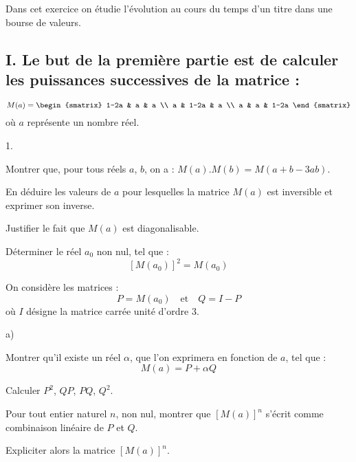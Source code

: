 \documentclass[11pt]{article}%
\begin{document}
Dans cet exercice on étudie l'évolution au cours du temps d'un titre
dans
une bourse de valeurs.

\subsection*{I. Le but de la première partie est de calculer les
puissances
successives de la matrice :}

\[
M(a) = 
\begin{smatrix}
1-2a & a & a \\
a & 1-2a & a \\
a & a & 1-2a
\end{smatrix}
\]
où $a$ représente un nombre réel.

\begin{noliste}{1.}
 \setlength{\itemsep}{4mm}
\item Montrer que, pour tous réels $a$, $b$, on a : $M(a).M(b) = M(a +
b-3ab)$.

\item En déduire les valeurs de $a$ pour lesquelles la matrice $M(a)$
est
inversible et exprimer son inverse.

\item Justifier le fait que $M(a)$ est diagonalisable.

\item Déterminer le réel $a_{0}$ non nul, tel que : 
\[
\left[ M(a_{0})\right] ^{2} = M(a_{0})
\]

\item On considère les matrices : 
\[
P = M(a_{0})\quad \text{et}\quad Q = I-P
\]
où $I$ désigne la matrice carrée unité d'ordre $3$.

\begin{noliste}{a)}
 \setlength{\itemsep}{2mm}
\item Montrer qu'il existe un réel $\alpha $, que l'on exprimera en
fonction
de $a$, tel que : 
\[
M(a) = P + \alpha Q
\]

\item Calculer $P^{2}$, $QP$, $PQ$, $Q^{2}$.

\item Pour tout entier naturel $n$, non nul, montrer que $\left[
M(a)\right]
^{n}$ s'écrit comme combinaison linéaire de $P$ et $Q$.

\item Expliciter alors la matrice $\left[ M(a)\right] ^{n}$.
\end{noliste}
\end{noliste}
\end{document}
